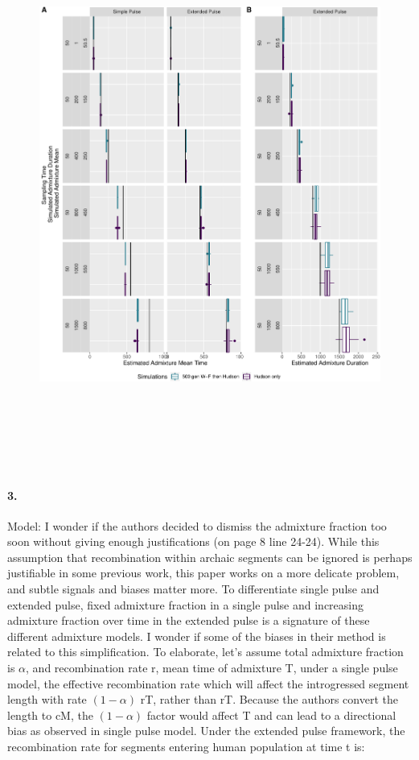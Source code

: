 \documentclass[11pt]{article}
\let\oldparagraph\paragraph
\renewcommand{\paragraph}[1]{\oldparagraph{#1}\mbox{}}
\begin{document}
\begin{figure}
\centering
\includegraphics[width=16cm,height=18cm,keepaspectratio]{ATE_Revisions_files/figure-latex/figR4-1.pdf}
\caption{\label{fig:fig_R} }
\end{figure}

\paragraph{3.}
Model: I wonder if the authors decided to dismiss the admixture fraction too soon without giving enough justifications (on page 8 line 24-24). While this assumption that recombination within archaic segments can be ignored is perhaps justifiable in some previous work, this paper works on a more delicate problem, and subtle signals and biases matter more. To differentiate single pulse and extended pulse, fixed admixture fraction in a single pulse and increasing admixture fraction over time in the extended pulse is a signature of these different admixture models. I wonder if some of the biases in their method is related to this simplification. To elaborate, let’s assume total admixture fraction is $\alpha$, and recombination rate r, mean time of admixture T, under a single pulse model, the effective recombination rate which will affect the introgressed segment length with rate $(1-\alpha)$ rT, rather than rT. Because the authors convert the length to cM, the $(1-\alpha)$ factor would affect T and can lead to a directional bias as observed in single pulse model. Under the extended pulse framework, the recombination rate for segments entering human population at time t is:
\end{document}

